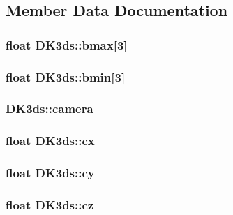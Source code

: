 \subsection{Member Data Documentation}
\hypertarget{class_d_k3ds_a48005a2684ba7baf584f7eba430405b0}{
\subsubsection[{bmax}]{\setlength{\rightskip}{0pt plus 5cm}float D\-K3ds\-::bmax\mbox{[}3\mbox{]}}}\label{class_d_k3ds_a48005a2684ba7baf584f7eba430405b0}
\hypertarget{class_d_k3ds_a545a26a1da5a9657ea733b3c68c5e47d}{
\subsubsection[{bmin}]{\setlength{\rightskip}{0pt plus 5cm}float D\-K3ds\-::bmin\mbox{[}3\mbox{]}}}\label{class_d_k3ds_a545a26a1da5a9657ea733b3c68c5e47d}
\hypertarget{class_d_k3ds_a990ac6faa0219928544e5327ea7f8e65}{
\subsubsection[{camera}]{ D\-K3ds\-::camera}}\label{class_d_k3ds_a990ac6faa0219928544e5327ea7f8e65}
\hypertarget{class_d_k3ds_add34cbc487ae2726b6a4758c58178026}{
\subsubsection[{cx}]{\setlength{\rightskip}{0pt plus 5cm}float D\-K3ds\-::cx}}\label{class_d_k3ds_add34cbc487ae2726b6a4758c58178026}
\hypertarget{class_d_k3ds_a786f24ce0f7bd9e98ebadd87e2ba3985}{
\subsubsection[{cy}]{\setlength{\rightskip}{0pt plus 5cm}float D\-K3ds\-::cy}}\label{class_d_k3ds_a786f24ce0f7bd9e98ebadd87e2ba3985}
\hypertarget{class_d_k3ds_a155aa1b4cfeeb5a1c76ca516f737b138}{
\subsubsection[{cz}]{\setlength{\rightskip}{0pt plus 5cm}float D\-K3ds\-::cz}}\label{class_d_k3ds_a155aa1b4cfeeb5a1c76ca516f737b138}
